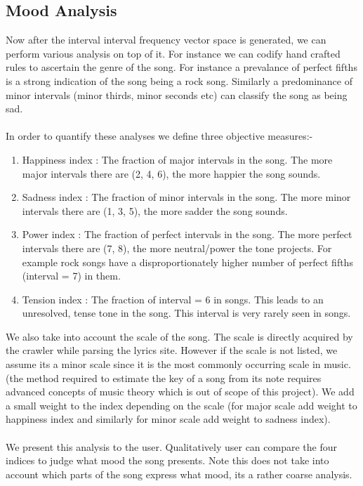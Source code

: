 \documentclass[letterpaper, 11pt]{article}
\begin{document}
\subsection*{Mood Analysis}
Now after the interval interval frequency vector space is generated, we can perform various analysis on top of it. For instance we can codify hand crafted rules to ascertain the genre of the song. For instance a prevalance of perfect fifths is a strong indication of the song being a rock song. Similarly a predominance of minor intervals (minor thirds, minor seconds etc) can classify the song as being sad. \\\\
In order to quantify these analyses we define three objective measures:-
\begin{enumerate}
\item Happiness index : The fraction of major intervals in the song. The more major intervals there are (2, 4, 6), the more happier the song sounds. 
\item Sadness index : The fraction of minor intervals in the song. The more minor intervals there are (1, 3, 5), the more sadder the song sounds. 
\item Power index : The fraction of perfect intervals in the song. The more perfect intervals there are (7, 8), the more neutral/power the tone projects. For example rock songs have a disproportionately higher number of perfect fifths (interval = 7) in them.
\item Tension index : The fraction of interval = 6 in songs. This leads to an unresolved, tense tone in the song. This interval is very rarely seen in songs.
\end{enumerate}
We also take into account the scale of the song. The scale is directly acquired by the crawler while parsing the lyrics site. However if the scale is not listed, we assume its a minor scale since it is the most commonly occurring scale in music. (the method required to estimate the key of a song from its note requires advanced concepts of music theory which is out of scope of this project). We add a small weight to the index depending on the scale (for major scale add weight to happiness index and similarly for minor scale add weight to sadness index). \\\\
We present this analysis to the user. Qualitatively user can compare the four indices to judge what mood the song presents. Note this does not take into account which parts of the song express what mood, its a rather coarse analysis.
\end{document}
